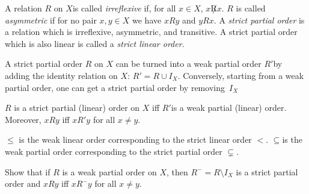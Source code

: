 \documentclass[open-logic-section]{subfiles}
\begin{document}
\begin{defn}
A relation $R$ on $X$is called \emph{irreflexive} if, for all $x\in
X$, $x\not Rx$. $R$ is called \emph{asymmetric} if for no pair $x,y\in
X$ we have $xRy$ and $yRx$. A \emph{strict partial order} is a
relation which is irreflexive, asymmetric, and transitive. A strict
partial order which is also linear is called a \emph{strict linear
  order.}
\end{defn}

A strict partial order $R$ on $X$ can be turned into a weak partial
order $R'$by adding the identity relation on $X$: $R'=R\cup I_{X}$.
Conversely, starting from a weak partial order, one can get a strict
partial order by removing~$I_{X}$

\begin{prop}
$R$ is a strict partial (linear) order on $X$ iff $R'$is a weak
  partial (linear) order. Moreover, $xRy$ iff $xR'y$ for all $x\neq
  y$.
\end{prop}

\begin{ex}
$\le$ is the weak linear order corresponding to the strict linear
  order $<$. $\subseteq$is the weak partial order corresponding to the
  strict partial order $\subsetneq$.
\end{ex}

\begin{prob}
Show that if $R$ is a weak partial order on $X$, then
$R^{-}=R\setminus I_{X}$ is a strict partial order and $xRy$ iff
$xR^{-}y$ for all $x\neq y$.
\end{prob}
\end{document}
